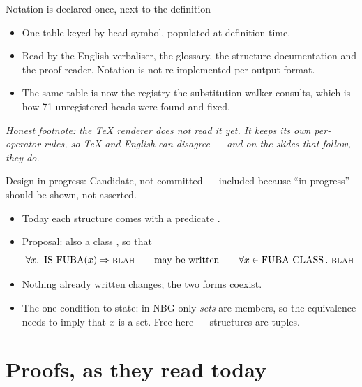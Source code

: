 \documentclass[11pt,aspectratio=169]{beamer}
\begin{document}
\begin{frame}[fragile]{Notation is declared once, next to the definition}
  \vspace{0.5ex}
  \begin{itemize}
    \item One table keyed by head symbol, populated at definition time.
    \item Read by the English verbaliser, the glossary, the structure
          documentation and the proof reader. Notation is not re-implemented
          per output format.
    \item The same table is now the registry the substitution walker consults,
          which is how 71 unregistered heads were found and fixed.
  \end{itemize}
  \vfill
  \small\emph{Honest footnote: the \TeX{} renderer does \emph{not} read it yet.
  It keeps its own per-operator rules, so \TeX{} and English can disagree ---
  and on the slides that follow, they do.}
\end{frame}

\begin{frame}{Design in progress: }
  Candidate, not committed --- included because ``in progress'' should be
  shown, not asserted.
  \begin{itemize}
    \item Today each structure  comes with a predicate
          .
    \item Proposal: also a class , so that
          \[
            \forall x.\ \operatorname{IS-FUBA}(x) \Rightarrow \textsc{blah}
            \qquad\text{may be written}\qquad
            \forall x \in \operatorname{FUBA-CLASS}.\ \textsc{blah}
          \]
    \item Nothing already written changes; the two forms coexist.
    \item The one condition to state: in NBG only \emph{sets} are members, so
          the equivalence needs  to imply that $x$ is a set.
          Free here --- structures are tuples.
  \end{itemize}
\end{frame}

\section{Proofs, as they read today}
\end{document}
